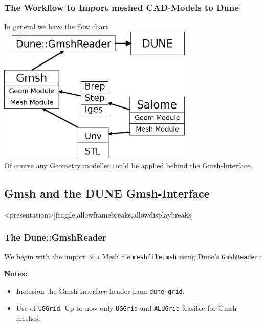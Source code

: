 \begin{frame}
  \frametitle<presentation>{The Workflow to Import meshed CAD-Models to Dune}
  \begin{center}
    In general we have the flow chart\\[5pt]
    \includegraphics[width=0.7\textwidth]{./EPS/workflow}\\[5pt]
    Of course any Geometry modeller could be applied behind the Gmsh-Interface.
  \end{center}
\end{frame}

\subsection{Gmsh and the DUNE Gmsh-Interface}

\begin{frame}<presentation>[fragile,allowframebreaks,allowdisplaybreaks]
  \frametitle{The Dune::GmshReader}
  We begin with the import of a Mesh file \lstinline!meshfile.msh! using Dune's
  \lstinline!GmshReader!:
  
  \textbf{Notes:}
  \begin{itemize}
    \item Inclusion the Gmsh-Interface header from \lstinline!dune-grid!.
    \item Use of \lstinline!UGGrid!. Up to now only \lstinline!UGGrid! and
      \lstinline!ALUGrid! feasible for Gmsh meshes.
  \end{itemize}
\end{frame}

